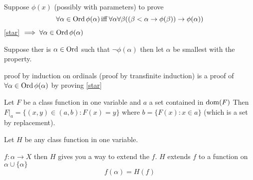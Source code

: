 Suppose $\phi(x)$ (possibly with parameters)
to prove 
\begin{equation}\label{star}
    \forall \alpha\in \operatorname{Ord}  \phi(\alpha) \operatorname{iff} \forall \alpha \forall \beta ((\beta<\alpha\to \phi(\beta))\to \phi(\alpha))
\end{equation}
\ref{star} $\implies \forall \alpha\in \operatorname{Ord}  \phi(\alpha)$

Suppose ther is $\alpha\in \operatorname{Ord} $ such that $\lnot \phi(\alpha)$ then let $\alpha$ be smallest with the property.

proof by induction on ordinals (proof by transfinite induction) is a proof of $\forall \alpha\in \operatorname{Ord}  \phi(\alpha)$ by proving \ref{star}

Let $F$ be a class function in one variable and $a$ a set contained in $\operatorname{dom} (F)$ 
Then $F|_{a} = \{(x,y)\in (a,b) : F(x) = y\}$ where $b = \{F(x) : x\in a\}$ (which is a set by replacement).

Let $H$ be any class function in one variable.


$f:\alpha\to X$ then $H$ gives you a way to extend the $f$.
$H$ extends $f$ to a function on $\alpha\cup\{\alpha\}$
$$f(\alpha) = H(f)$$


